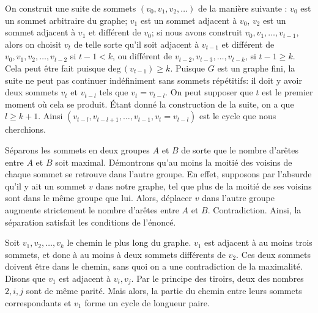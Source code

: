 \begin{sol}

On construit une suite de sommets $(v_0, v_1, v_2,\ldots)$ de la manière suivante :
$v_0$ est un sommet arbitraire du graphe; $v_1$ est un sommet adjacent à $v_0$, $v_2$ est un sommet adjacent à $v_1$ et différent de $v_0$; si nous avons construit $v_0, v_1, \ldots, v_{t-1}$, alors on choisit $v_t$ de telle sorte qu’il soit adjacent à $v_{t-1}$ et différent de $v_0, v_1, v_2, \ldots, v_{t-2}$ si $t-1<k$, ou différent de $v_{t-2}, v_{t-3}, \ldots , v_{t-k}$, si $t-1\geq k$. Cela peut être fait puisque
$\mathrm{deg}\,(v_{t-1})\geq k.$ Puisque $G$ est un graphe fini, la suite ne peut pas continuer indéfiniment sans sommets répétitifs: il doit y avoir deux sommets $v_t$ et $v_{t-l}$ tels que $v_t = v_{t-l}$.
On peut supposer que $t$ est le premier moment où cela se produit. Étant donné la construction de la suite, on a que $l\geq k + 1$. Ainsi $(v_{t-l}, v_{t-l+1}, \ldots, v_{t-1}, v_{t} = v_{t-l})$ est
le cycle que nous cherchions.\\

\end{sol}

\begin{sol}
Séparons les sommets en deux groupes $A$ et $B$ de sorte que le nombre d’arêtes entre $A$ et $B$ soit maximal. Démontrons qu’au moins la moitié des voisins de chaque sommet se retrouve dans l’autre groupe. En effet, supposons par l’absurde qu’il y ait un sommet $v$ dans notre graphe, tel que plus de la moitié de ses voisins sont dans le même groupe que lui. Alors, déplacer $v$ dans l’autre groupe augmente strictement le nombre d’arêtes entre $A$ et $B$. Contradiction. Ainsi, la séparation satisfait les conditions de l’énoncé.\\

\end{sol}


\begin{sol}
Soit $v_1, v_2,\ldots , v_k$ le chemin le plus long du graphe. $v_1$ est adjacent à au moins trois sommets, et donc à au moins à deux sommets différents de $v_2$. Ces deux sommets doivent être dans le chemin, sans quoi on a une contradiction de la maximalité. Disons que $v_1$ est adjacent à $v_i , v_j$. Par le principe des tiroirs, deux des nombres $2, i, j$ sont de même parité.
Mais alors, la partie du chemin entre leurs sommets correspondants et $v_1$ forme un cycle de longueur paire.\\

\end{sol}


